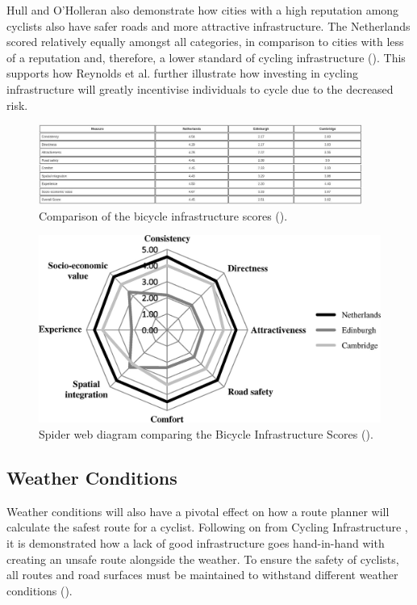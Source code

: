 Hull and O'Holleran also demonstrate how cities with a high reputation among cyclists also have safer roads and more attractive infrastructure. The Netherlands scored relatively equally amongst all categories, in comparison to cities with less of a reputation and, therefore, a lower standard of cycling infrastructure   (\cite{hull_bicycle_2014}). This supports how Reynolds et al. further illustrate how investing in cycling infrastructure will greatly incentivise individuals to cycle due to the decreased risk. 

\begin{figure}
    \centering
    \includegraphics[width=400px, keepaspectratio]{figures/bicycle_infrastructure_score_table.jpg}
    \caption{Comparison of the bicycle infrastructure scores (\cite{hull_bicycle_2014}).}
    \label{fig:bicycleinfrastructurescorestable}
\end{figure}

\begin{figure}
    \centering
    \includegraphics{figures/bicycle_infrastructure_scores.jpg}
    \caption{Spider web diagram comparing the Bicycle Infrastructure Scores (\cite{hull_bicycle_2014}).}
    \label{fig:bicycleinfrastructurescores}
\end{figure}

\subsection{Weather Conditions}
\label{litrev:weatherconditions}
Weather conditions will also have a pivotal effect on how a route planner will calculate the safest route for a cyclist. Following on from Cycling Infrastructure , it is demonstrated how a lack of good infrastructure goes hand-in-hand with creating an unsafe route alongside the weather. To ensure the safety of cyclists, all routes and road surfaces must be maintained to withstand different weather conditions (\cite{shoman_evaluation_2023}).

